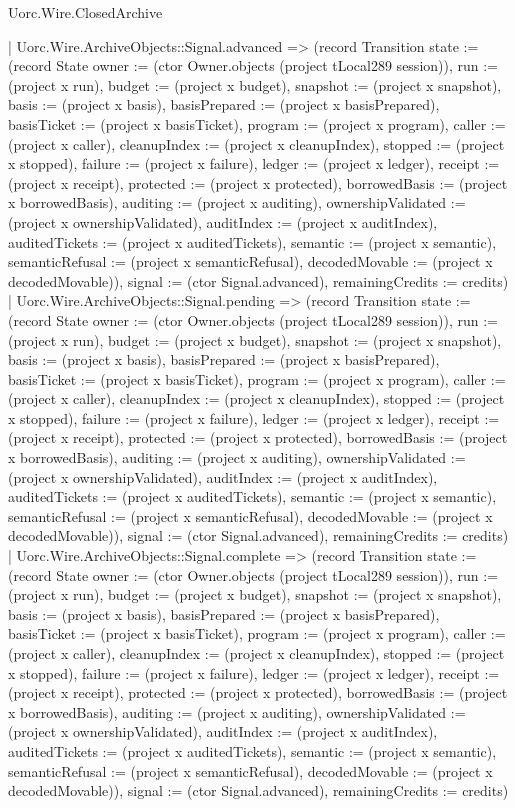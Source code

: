 \begin{lexlean}{Uorc.Wire.ClosedArchive}
\begin{semanticmodule}
{      | Uorc.Wire.ArchiveObjects::Signal.advanced => (record Transition {state := (record State {owner := (ctor Owner.objects (project tLocal289 session)), run := (project x run), budget := (project x budget), snapshot := (project x snapshot), basis := (project x basis), basisPrepared := (project x basisPrepared), basisTicket := (project x basisTicket), program := (project x program), caller := (project x caller), cleanupIndex := (project x cleanupIndex), stopped := (project x stopped), failure := (project x failure), ledger := (project x ledger), receipt := (project x receipt), protected := (project x protected), borrowedBasis := (project x borrowedBasis), auditing := (project x auditing), ownershipValidated := (project x ownershipValidated), auditIndex := (project x auditIndex), auditedTickets := (project x auditedTickets), semantic := (project x semantic), semanticRefusal := (project x semanticRefusal), decodedMovable := (project x decodedMovable)}), signal := (ctor Signal.advanced), remainingCredits := credits})
      | Uorc.Wire.ArchiveObjects::Signal.pending => (record Transition {state := (record State {owner := (ctor Owner.objects (project tLocal289 session)), run := (project x run), budget := (project x budget), snapshot := (project x snapshot), basis := (project x basis), basisPrepared := (project x basisPrepared), basisTicket := (project x basisTicket), program := (project x program), caller := (project x caller), cleanupIndex := (project x cleanupIndex), stopped := (project x stopped), failure := (project x failure), ledger := (project x ledger), receipt := (project x receipt), protected := (project x protected), borrowedBasis := (project x borrowedBasis), auditing := (project x auditing), ownershipValidated := (project x ownershipValidated), auditIndex := (project x auditIndex), auditedTickets := (project x auditedTickets), semantic := (project x semantic), semanticRefusal := (project x semanticRefusal), decodedMovable := (project x decodedMovable)}), signal := (ctor Signal.advanced), remainingCredits := credits})
      | Uorc.Wire.ArchiveObjects::Signal.complete => (record Transition {state := (record State {owner := (ctor Owner.objects (project tLocal289 session)), run := (project x run), budget := (project x budget), snapshot := (project x snapshot), basis := (project x basis), basisPrepared := (project x basisPrepared), basisTicket := (project x basisTicket), program := (project x program), caller := (project x caller), cleanupIndex := (project x cleanupIndex), stopped := (project x stopped), failure := (project x failure), ledger := (project x ledger), receipt := (project x receipt), protected := (project x protected), borrowedBasis := (project x borrowedBasis), auditing := (project x auditing), ownershipValidated := (project x ownershipValidated), auditIndex := (project x auditIndex), auditedTickets := (project x auditedTickets), semantic := (project x semantic), semanticRefusal := (project x semanticRefusal), decodedMovable := (project x decodedMovable)}), signal := (ctor Signal.advanced), remainingCredits := credits})
}
\end{semanticmodule}
\end{lexlean}
